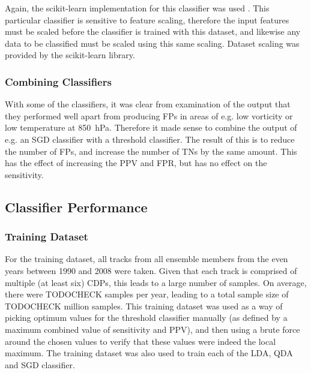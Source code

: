 \documentclass[pdftex,12pt,a4paper]{report}
\begin{document}
Again, the scikit-learn implementation for this classifier was used \parencite{scikitLearn2011}.
This particular classifier is sensitive to feature scaling, therefore the input features must be
scaled before the classifier is trained with this dataset, and likewise any data to be classified
must be scaled using this same scaling. Dataset scaling was provided by the scikit-learn library.

\subsubsection{Combining Classifiers}
With some of the classifiers, it was clear from examination of the output that they performed well
apart from producing FPs in areas of e.g. low vorticity or low temperature at \SI{850}{hPa}.
Therefore it made sense to combine the output of e.g. an SGD classifier with a threshold classifier.
The result of this is to reduce the number of FPs, and increase the number of TNs by the same
amount. This has the effect of increasing the PPV and FPR, but has no effect on the sensitivity.

\subsection{Classifier Performance}



\subsubsection{Training Dataset}
For the training dataset, all tracks from all ensemble members from the even years between 1990 and
2008 were taken. Given that each track is comprised of multiple (at least six) CDPs, this leads to a
large number of samples. On average, there were TODOCHECK samples per year, leading to a total
sample size of TODOCHECK million samples. This training dataset was used as a way of picking optimum
values for the threshold classifier manually (as defined by a maximum combined value of sensitivity
and PPV), and then using a brute force around the chosen values to verify that these values were
indeed the local maximum. The training dataset was also used to train each of the LDA, QDA and SGD
classifier.
\end{document}
